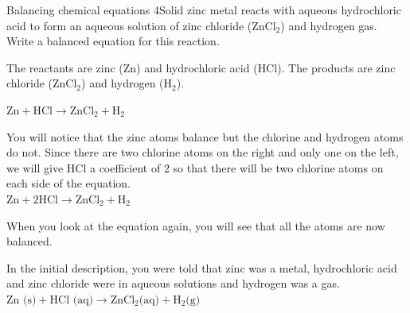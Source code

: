 \begin{wex}{Balancing chemical equations 4}{Solid zinc metal reacts with aqueous hydrochloric acid to form an aqueous solution of zinc chloride ($\text{ZnCl}_{2}$) and hydrogen gas. Write a balanced equation for this reaction.}

{
The reactants are zinc ($\text{Zn}$) and hydrochloric acid ($\text{HCl}$). The products are zinc chloride ($\text{ZnCl}_{2}$) and hydrogen ($\text{H}_{2}$).

${\text{Zn} + \text{HCl} \rightarrow \text{ZnCl}_{2} + \text{H}_{2}}$

You will notice that the zinc atoms balance but the chlorine and hydrogen atoms do not. Since there are two chlorine atoms on the right and only one on the left, we will give HCl a coefficient of 2 so that there will be two chlorine atoms on each side of the equation.\\
${\text{Zn} + 2\text{HCl} \rightarrow \text{ZnCl}_{2} + \text{H}_{2}}$

When you look at the equation again, you will see that all the atoms are now balanced.

In the initial description, you were told that zinc was a metal, hydrochloric acid and zinc chloride were in aqueous solutions and hydrogen was a gas.\\
$\text{Zn (s)} + \text{HCl (aq)} \rightarrow \text{ZnCl}_{2} \text{(aq)} + \text{H}_{2} \text{(g)}$
}
\end{wex}
    \noindent
\par

